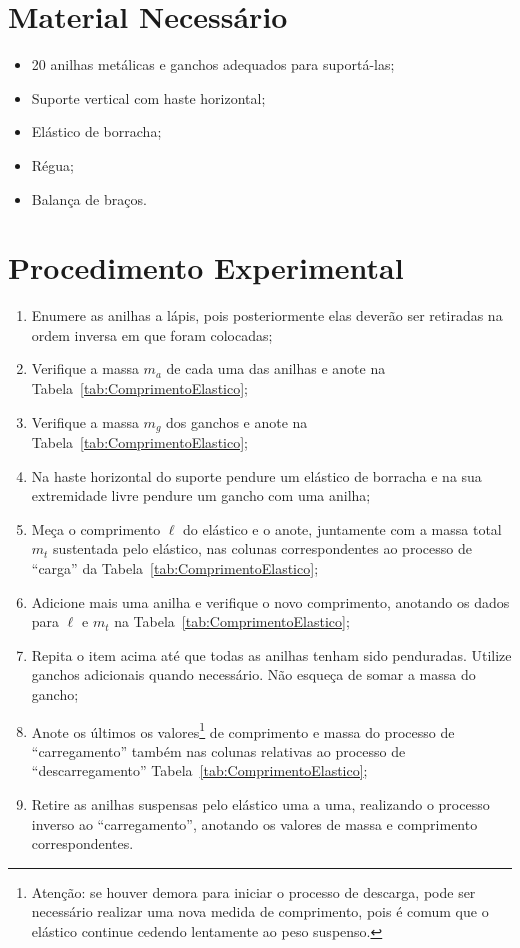 \section{Material Necessário}

\begin{itemize}
	\item 20 anilhas metálicas e ganchos adequados para suportá-las;
	\item Suporte vertical com haste horizontal;
	\item Elástico de borracha;
	\item Régua;
	\item Balança de braços.
\end{itemize}

\section{Procedimento Experimental}

\begin{enumerate}
    \item Enumere as anilhas a lápis, pois posteriormente elas deverão ser retiradas na ordem inversa em que foram colocadas;
	\item Verifique a massa $m_a$ de cada uma das anilhas e anote na Tabela~\ref{tab:ComprimentoElastico};
	\item Verifique a massa $m_g$ dos ganchos e anote na Tabela~\ref{tab:ComprimentoElastico};
	\item Na haste horizontal do suporte pendure um elástico de borracha e na sua extremidade livre pendure um gancho com uma anilha;
	\item Meça o comprimento $\ell$ do elástico e o anote, juntamente com a massa total $m_t$ sustentada pelo elástico, nas colunas correspondentes ao processo de ``carga'' da Tabela~\ref{tab:ComprimentoElastico};
	\item Adicione mais uma anilha e verifique o novo comprimento, anotando os dados para $\ell$ e $m_t$ na Tabela~\ref{tab:ComprimentoElastico};
	\item Repita o item acima até que todas as anilhas tenham sido penduradas. Utilize ganchos adicionais quando necessário. Não esqueça de somar a massa do gancho;
	\item Anote os últimos os valores\footnote{Atenção: se houver demora para iniciar o processo de descarga, pode ser necessário realizar uma nova medida de comprimento, pois é comum que o elástico continue cedendo lentamente ao peso suspenso.} de comprimento e massa do processo de ``carregamento'' também nas colunas relativas ao processo de ``descarregamento'' Tabela~\ref{tab:ComprimentoElastico};
	\item Retire as anilhas suspensas pelo elástico uma a uma, realizando o processo inverso ao ``carregamento'', anotando os valores de massa e comprimento correspondentes.
\end{enumerate}

